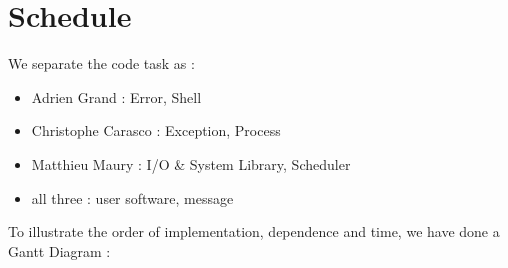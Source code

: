 \chapter{Schedule}

We separate the code task as :
\begin{itemize}
  \item Adrien Grand : Error, Shell
  \item Christophe Carasco : Exception, Process
  \item Matthieu Maury : I/O \& System Library, Scheduler
  \item all three : user software, message
\end{itemize}

To illustrate the order of implementation, dependence and time, we have done a Gantt Diagram :

\begin{figure}[h]
  \begin{center}
  \end{center}
\end{figure}
\begin{figure}[h]
  \begin{center}
  \end{center}
\end{figure}
